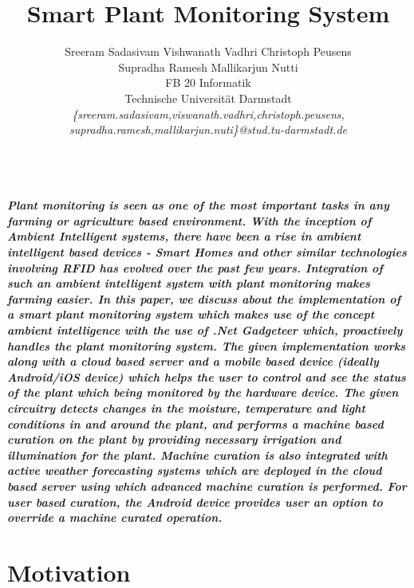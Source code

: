 \documentclass[10pt]{article}
\begin{document}
\title{\textbf{Smart Plant Monitoring System}}
\author{
\quad Sreeram Sadasivam \quad Vishwanath Vadhri \quad Christoph Peusens\\
\quad Supradha Ramesh \quad Mallikarjun Nutti\\
FB 20 Informatik\\
Technische Universität Darmstadt\\
\emph{\{sreeram.sadasivam,viswanath.vadhri,christoph.peusens,}\\
\emph{supradha.ramesh,mallikarjun.nuti\}@stud.tu-darmstadt.de}\\
\date{}
}
\maketitle
\textbf{\abstractname{
\emph {\textbf{\\
Plant monitoring is seen as one of the most important tasks in any farming or agriculture based environment. With the inception of Ambient Intelligent systems, there have been a rise in ambient intelligent based devices - Smart Homes\cite{ref001} and other similar technologies involving RFID has evolved over the past few years\cite{ref002}. Integration of such an ambient intelligent system with plant monitoring makes farming easier. In this paper, we discuss about the implementation of a smart plant monitoring system which makes use of the concept ambient intelligence with the use of .Net Gadgeteer which, proactively handles the plant monitoring system. The given implementation works along with a cloud based server and a mobile based device (ideally Android/iOS device) which helps the user to control and see the status of the plant which being monitored by the hardware device. The given circuitry detects changes in the moisture, temperature and light conditions in and around the plant, and performs a machine based curation on the plant by providing necessary irrigation and illumination for the plant. Machine curation is also integrated with active weather forecasting systems which are deployed in the cloud based server using which advanced machine curation is performed. For user based curation, the Android device provides user an option to override a machine curated operation. %
}}}}

\section*{Motivation}

\end{document}
